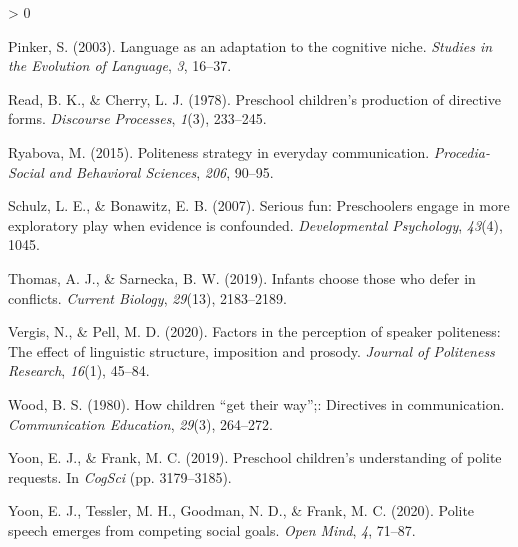 \documentclass[
  english,
  man,floatsintext]{apa6}
\newlength{\cslhangindent}
\newenvironment{CSLReferences}[2] %
 {%
  \setlength{\parindent}{0pt}
  \ifodd #1 \everypar{\setlength{\hangindent}{\cslhangindent}}\ignorespaces\fi
  \ifnum #2 > 0
  \setlength{\parskip}{#2\baselineskip}
  \fi
 }%
 {}
\begin{document}
\begin{CSLReferences}{1}{0}
\leavevmode\hypertarget{ref-pinker2003}{}%
Pinker, S. (2003). Language as an adaptation to the cognitive niche. \emph{Studies in the Evolution of Language}, \emph{3}, 16--37.

\leavevmode\hypertarget{ref-read1978}{}%
Read, B. K., \& Cherry, L. J. (1978). Preschool children's production of directive forms. \emph{Discourse Processes}, \emph{1}(3), 233--245.

\leavevmode\hypertarget{ref-ryabova2015}{}%
Ryabova, M. (2015). Politeness strategy in everyday communication. \emph{Procedia-Social and Behavioral Sciences}, \emph{206}, 90--95.

\leavevmode\hypertarget{ref-schulz2007}{}%
Schulz, L. E., \& Bonawitz, E. B. (2007). Serious fun: Preschoolers engage in more exploratory play when evidence is confounded. \emph{Developmental Psychology}, \emph{43}(4), 1045.

\leavevmode\hypertarget{ref-thomas2019}{}%
Thomas, A. J., \& Sarnecka, B. W. (2019). Infants choose those who defer in conflicts. \emph{Current Biology}, \emph{29}(13), 2183--2189.

\leavevmode\hypertarget{ref-vergis2020}{}%
Vergis, N., \& Pell, M. D. (2020). Factors in the perception of speaker politeness: The effect of linguistic structure, imposition and prosody. \emph{Journal of Politeness Research}, \emph{16}(1), 45--84.

\leavevmode\hypertarget{ref-wood1980}{}%
Wood, B. S. (1980). How children {``get their way''};: Directives in communication. \emph{Communication Education}, \emph{29}(3), 264--272.

\leavevmode\hypertarget{ref-yoon2019}{}%
Yoon, E. J., \& Frank, M. C. (2019). Preschool children's understanding of polite requests. In \emph{CogSci} (pp. 3179--3185).

\leavevmode\hypertarget{ref-yoon2020}{}%
Yoon, E. J., Tessler, M. H., Goodman, N. D., \& Frank, M. C. (2020). Polite speech emerges from competing social goals. \emph{Open Mind}, \emph{4}, 71--87.

\end{CSLReferences}

\endgroup
\end{document}
